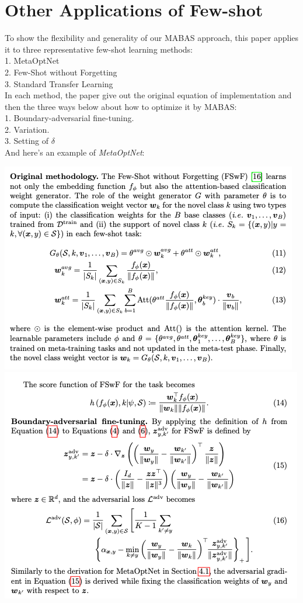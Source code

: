 \documentclass{article}
\begin{document}
\section{Other Applications of Few-shot}
To show the flexibility and generality of our MABAS approach, 
this paper applies it to three representative few-shot learning methods: \\
1. MetaOptNet \\
2. Few-Shot without Forgetting \\
3. Standard Transfer Learning \\

In each method, the paper give out the original equation of implementation 
and then the three ways below about how to optimize it by MABAS: \\
1. Boundary-adversarial fine-tuning. \\
2. Variation. \\
3. Setting of $\delta$ \\
And here's an example of \textit{MetaOptNet}: \\
\begin{center}
    \includegraphics[scale=0.6]{src/img/MetaOptNet1.jpg} \\
    \includegraphics[scale=0.6]{src/img/MetaOptNet2.jpg} \\
\end{center}
\end{document}
